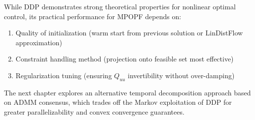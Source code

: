 While DDP demonstrates strong theoretical properties for nonlinear optimal control, its practical performance for MPOPF depends on:
\begin{enumerate}
    \item Quality of initialization (warm start from previous solution or LinDistFlow approximation)
    \item Constraint handling method (projection onto feasible set most effective)
    \item Regularization tuning (ensuring $Q_{uu}$ invertibility without over-damping)
\end{enumerate}

The next chapter explores an alternative temporal decomposition approach based on ADMM consensus, which trades off the Markov exploitation of DDP for greater parallelizability and convex convergence guarantees.
